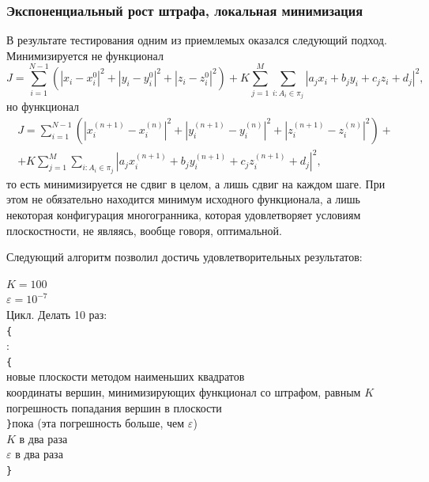 \documentclass[a4paper,12pt, titlepage]{article}
\begin{document}
\subsubsection{Экспоненциальный рост штрафа, локальная минимизация}
\begin{flushleft}
 В результате тестирования одним из приемлемых оказался следующий подход. Минимизируется не функционал
$$
	J = \sum\limits_{i = 1}^{N - 1}(|x_{i} - x_{i}^{0}|^{2} + |y_{i} - y_{i}^{0}|^{2} 
	+ |z_{i} - z_{i}^{0}|^{2}) + 
	K\sum\limits_{j = 1}^{M}\sum\limits_{i: A_{i} \in \pi_{j}}
	|a_{j}x_{i} + b_{j}y_{i} + c_{j}z_{i} + d_{j}|^{2},
$$ но функционал
$$
  \begin{aligned}
	J = \sum\limits_{i = 1}^{N - 1}(|x_{i}^{(n+1)} - x_{i}^{(n)}|^{2} + |y_{i}^{(n+1)} - y_{i}^{(n)}|^{2} 
	+ |z_{i}^{(n+1)} - z_{i}^{(n)}|^{2}) + \\
	+ K\sum\limits_{j = 1}^{M}\sum\limits_{i: A_{i} \in \pi_{j}}
	|a_{j}x_{i}^{(n+1)} + b_{j}y_{i}^{(n+1)} + c_{j}z_{i}^{(n+1)} + d_{j}|^{2},
  \end{aligned}
$$то есть минимизируется не сдвиг в целом, а лишь сдвиг на каждом шаге. При этом не обязательно находится
минимум исходного функционала, а лишь некоторая конфигурация многогранника, которая удовлетворяет условиям
плоскостности, не являясь, вообще говоря, оптимальной.
\end{flushleft}
\begin{flushleft}
Следующий алгоритм позволил достичь удовлетворительных результатов:\\
\end{flushleft}
\begin{flushleft}
$K = 100$\\
$\varepsilon = 10^{-7}$\\
Цикл. Делать 10 раз:\\
\verb"{"\\
: \\
\quad\verb"{"\\
\quad{} новые плоскости методом наименьших квадратов\\
\quad{} координаты вершин, минимизирующих функционал со штрафом, равным $K$\\
\quad{} погрешность попадания вершин в плоскости\\
\quad\verb"}"пока (эта погрешность больше, чем $\varepsilon$)\\
 $K$ в два раза\\
 $\varepsilon$ в два раза\\
\verb"}"\\
\end{flushleft}
\end{document}
